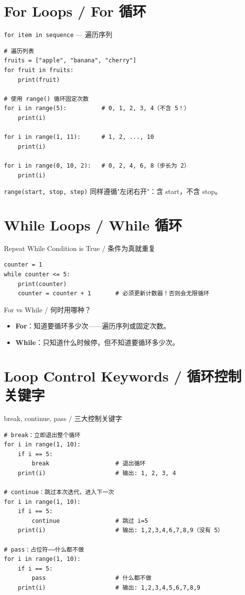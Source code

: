\documentclass[11pt,a4paper]{report}
\let\oldtexttt\texttt
\renewcommand{\texttt}[1]{\textcolor{mainblue}{\oldtexttt{#1}}}
\begin{document}
\section{For Loops / For 循环}

\begin{concept}{\texttt{for item in sequence} — 遍历序列}
\begin{lstlisting}
# 遍历列表
fruits = ["apple", "banana", "cherry"]
for fruit in fruits:
    print(fruit)

# 使用 range() 循环固定次数
for i in range(5):          # 0, 1, 2, 3, 4（不含 5！）
    print(i)

for i in range(1, 11):      # 1, 2, ..., 10
    print(i)

for i in range(0, 10, 2):   # 0, 2, 4, 6, 8（步长为 2）
    print(i)
\end{lstlisting}
\texttt{range(start, stop, step)} 同样遵循"左闭右开"：含 start，不含 stop。
\end{concept}

\section{While Loops / While 循环}

\begin{concept}{Repeat While Condition is True / 条件为真就重复}
\begin{lstlisting}
counter = 1
while counter <= 5:
    print(counter)
    counter = counter + 1       # 必须更新计数器！否则会无限循环
\end{lstlisting}
\end{concept}

\begin{warning}{For vs While / 何时用哪种？}
\begin{itemize}[itemsep=0.3em]
    \item \textbf{For}：知道要循环多少次——遍历序列或固定次数。
    \item \textbf{While}：只知道什么时候停，但不知道要循环多少次。
\end{itemize}
\end{warning}

\section{Loop Control Keywords / 循环控制关键字}

\begin{concept}{break, continue, pass / 三大控制关键字}
\begin{lstlisting}
# break：立即退出整个循环
for i in range(1, 10):
    if i == 5:
        break                   # 退出循环
    print(i)                    # 输出: 1, 2, 3, 4

# continue：跳过本次迭代，进入下一次
for i in range(1, 10):
    if i == 5:
        continue                # 跳过 i=5
    print(i)                    # 输出: 1,2,3,4,6,7,8,9（没有 5）

# pass：占位符——什么都不做
for i in range(1, 10):
    if i == 5:
        pass                    # 什么都不做
    print(i)                    # 输出: 1,2,3,4,5,6,7,8,9
\end{lstlisting}
\end{concept}
\end{document}
